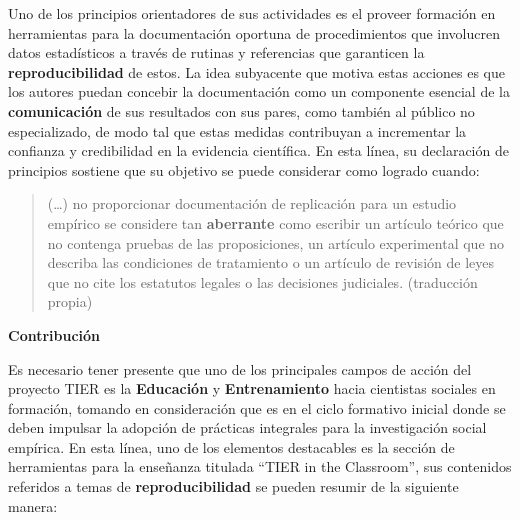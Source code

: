 \documentclass[
  spanish,
  a4paper,
  oneside]{scrbook}
\begin{document}
Uno de los principios orientadores de sus actividades es el proveer
formación en herramientas para la documentación oportuna de
procedimientos que involucren datos estadísticos a través de rutinas y
referencias que garanticen la \textbf{reproducibilidad} de estos. La
idea subyacente que motiva estas acciones es que los autores puedan
concebir la documentación como un componente esencial de la
\textbf{comunicación} de sus resultados con sus pares, como también al
público no especializado, de modo tal que estas medidas contribuyan a
incrementar la confianza y credibilidad en la evidencia científica. En
esta línea, su declaración de principios sostiene que su objetivo se
puede considerar como logrado cuando:

\begin{quote}
(\ldots) no proporcionar documentación de replicación para un estudio
empírico se considere tan \textbf{aberrante} como escribir un artículo
teórico que no contenga pruebas de las proposiciones, un artículo
experimental que no describa las condiciones de tratamiento o un
artículo de revisión de leyes que no cite los estatutos legales o las
decisiones judiciales. (traducción propia)
\end{quote}

\textbf{Contribución}

Es necesario tener presente que uno de los principales campos de acción
del proyecto TIER es la \textbf{Educación} y \textbf{Entrenamiento}
hacia cientistas sociales en formación, tomando en consideración que es
en el ciclo formativo inicial donde se deben impulsar la adopción de
prácticas integrales para la investigación social empírica. En esta
línea, uno de los elementos destacables es la sección de herramientas
para la enseñanza titulada ``TIER in the Classroom'', sus contenidos
referidos a temas de \textbf{reproducibilidad} se pueden resumir de la
siguiente manera:
\end{document}
